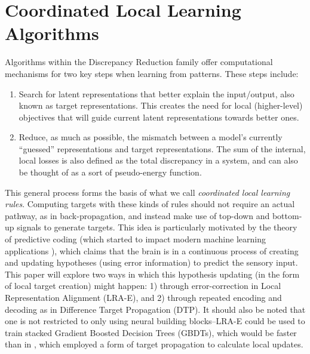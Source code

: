 \documentclass[letterpaper]{article} %
\begin{document}
\section{Coordinated Local Learning Algorithms} %
\label{sec:lra_dr}
Algorithms within the Discrepancy Reduction \cite{ororbia2017learning} family offer computational mechanisms for two key steps when learning from patterns. These steps include:
\begin{enumerate}
	\item Search for latent representations that better explain the input/output, also known as target representations. This creates the need for local (higher-level) objectives that will guide current latent representations towards better ones.
    \item Reduce, as much as possible, the mismatch between a model's currently ``guessed'' representations and target representations. The sum of the internal, local losses is also defined as the total discrepancy in a system, and can also be thought of as a sort of pseudo-energy function.
\end{enumerate}
This general process forms the basis of what we call \emph{coordinated local learning rules}. Computing targets with these kinds of rules should not require an actual pathway, as in back-propagation, and instead make use of top-down and bottom-up signals to generate targets. This idea is particularly motivated by the theory of predictive coding \cite{panichello2013predictive} (which started to impact modern machine learning applications \cite{li2018predictive}), which claims that the brain is in a continuous process of creating and updating hypotheses (using error information) to predict the sensory input.
This paper will explore two ways in which this hypothesis updating (in the form of local target creation) might happen: 1) through error-correction in Local Representation Alignment (LRA-E), and 2) through repeated encoding and decoding as in Difference Target Propagation (DTP).
%
It should also be noted that one is not restricted to only using neural building blocks--LRA-E could be used to train stacked Gradient Boosted Decision Trees (GBDTs), which would be faster than in \cite{feng2018multi}, which employed a form of target propagation to calculate local updates.
\end{document}
